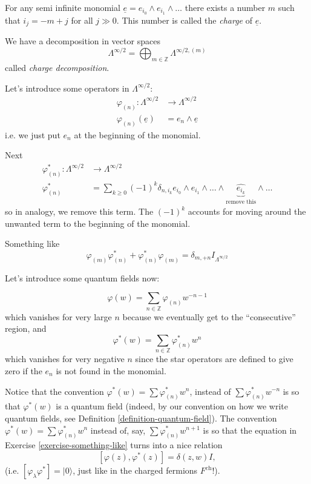 For any semi infinite monomial
$\underline{e}=e_{i_0}\wedge e_{i_1}\wedge \ldots$
there exists a number $m$ such that
$i_j=-m+j$ for all  $j \gg 0$.
This number is called the {\it charge} of $\underline{e}$.

We have a decomposition in vector spaces
$$
\Lambda^{\infty/2}=\bigoplus_{m \in \mathbb{Z}}\Lambda^{\infty/2,(m)}
$$
called {\it charge decomposition}.

Let's introduce some operators in  $\Lambda^{\infty/2}$:
\begin{align*}
\varphi_{(n)}: \Lambda^{\infty/2} &\longrightarrow \Lambda^{\infty/2} \\
\varphi_{(n)}(\underline{e}) &= e_n \wedge \underline{e} 
\end{align*}
i.e. we just put $e_n$ at the beginning of the 
monomial.

Next
\begin{align*}
\varphi_{(n)}^*: \Lambda^{\infty/2} &\longrightarrow \Lambda^{\infty/2} \\
\varphi^*_{(n)} & =\sum_{k \geq 0}(-1)^k \delta_{n,i_k}
e_{i_0}\wedge e_{i_1}\wedge \ldots \wedge
\underbrace{\widehat{e_{i_k}}}_{\text{remove this}}\wedge \ldots
\end{align*}
so in analogy, we remove this term.
The $(-1)^k$ accounts for moving around the unwanted
term to the beginning of the monomial.

\begin{exercise}
\label{exercise-something-like}
Something like
$$
\varphi_{(m)}\varphi^*_{(n)}
+\varphi_{(n)}^*\varphi_{(m)}=
\delta_{m,+n}I_{\Lambda^{\infty/2}}
$$
\end{exercise}

Let's introduce some quantum fields now:

$$
\varphi(w)=\sum_{ n \in \mathbb{Z}}\varphi_{(n)}w^{-n-1}
$$
which vanishes for very large $n$ because
we eventually get to the ``consecutive'' region,
and
$$
\varphi^*(w)=\sum_{ n \in \mathbb{Z}}\varphi^*_{(n)}w^{n}
$$
which vanishes for very negative $n$ since the
star operators are defined to give zero
if the $e_n$ is not found in the monomial.

Notice that the convention  $\varphi^*(w)=\sum \varphi^*_{(n)}w^n$,
instead of $\sum \varphi^*_{(n)}w^{-n}$ is so that
$\varphi^*(w)$ is a quantum field
(indeed, by our convention on how we write quantum fields,
see Definition \ref{definition-quantum-field}).
The convention $\varphi^*(w)=\sum \varphi^*_{(n)}w^n$ 
instead of, say, $\sum \varphi_{(n)}^* w^{n+1}$
is so that the equation in 
Exercise \ref{exercise-something-like}
turns into a nice relation
$$
[\varphi(z),\varphi^*(z)]=\delta(z,w)I,
$$
(i.e. $[\varphi_\lambda \varphi^* ]=|0\rangle$, just like in the
charged fermions $F^{\text{ch}}$!).

